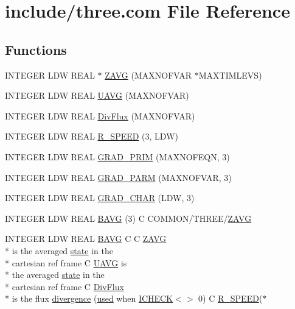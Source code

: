 \hypertarget{three_8com}{\section{include/three.com File Reference}
\label{three_8com}
}
\subsection*{Functions}
\begin{DoxyCompactItemize}
\item 
I\-N\-T\-E\-G\-E\-R L\-D\-W R\-E\-A\-L $\ast$ \hyperlink{three_8com_a63efc6c7080809fef3845bb143f55d41}{Z\-A\-V\-G} (M\-A\-X\-N\-O\-F\-V\-A\-R $\ast$M\-A\-X\-T\-I\-M\-L\-E\-V\-S)
\item 
I\-N\-T\-E\-G\-E\-R L\-D\-W R\-E\-A\-L \hyperlink{three_8com_ad59e2d047908ce4ed3fc820d45a326fb}{U\-A\-V\-G} (M\-A\-X\-N\-O\-F\-V\-A\-R)
\item 
I\-N\-T\-E\-G\-E\-R L\-D\-W R\-E\-A\-L \hyperlink{three_8com_a540efd196c8ba8ffacd2054d7cd37c3d}{Div\-Flux} (M\-A\-X\-N\-O\-F\-V\-A\-R)
\item 
I\-N\-T\-E\-G\-E\-R L\-D\-W R\-E\-A\-L \hyperlink{three_8com_ab9b65ce69bcdbe659e8abbf2992e665d}{R\-\_\-\-S\-P\-E\-E\-D} (3, L\-D\-W)
\item 
I\-N\-T\-E\-G\-E\-R L\-D\-W R\-E\-A\-L \hyperlink{three_8com_a92eab26680b58f9932bafdd58c32b8e2}{G\-R\-A\-D\-\_\-\-P\-R\-I\-M} (M\-A\-X\-N\-O\-F\-E\-Q\-N, 3)
\item 
I\-N\-T\-E\-G\-E\-R L\-D\-W R\-E\-A\-L \hyperlink{three_8com_a0716486ee6cba1f79eb140111cd27fbe}{G\-R\-A\-D\-\_\-\-P\-A\-R\-M} (M\-A\-X\-N\-O\-F\-V\-A\-R, 3)
\item 
I\-N\-T\-E\-G\-E\-R L\-D\-W R\-E\-A\-L \hyperlink{three_8com_a833c4eb4d311193f2327073489bfc52d}{G\-R\-A\-D\-\_\-\-C\-H\-A\-R} (L\-D\-W, 3)
\item 
I\-N\-T\-E\-G\-E\-R L\-D\-W R\-E\-A\-L \hyperlink{three_8com_a2408f8f2389b05690b544c00ce3e4f85}{B\-A\-V\-G} (3) C C\-O\-M\-M\-O\-N/T\-H\-R\-E\-E/\hyperlink{three_8com_a63efc6c7080809fef3845bb143f55d41}{Z\-A\-V\-G}
\item 
I\-N\-T\-E\-G\-E\-R L\-D\-W R\-E\-A\-L \hyperlink{three_8com_a2408f8f2389b05690b544c00ce3e4f85}{B\-A\-V\-G} C C \hyperlink{three_8com_a63efc6c7080809fef3845bb143f55d41}{Z\-A\-V\-G} \\*
is the averaged \hyperlink{merkle_8com_a0ca46ab387e5b2d25720de7e533a6180}{state} in the \\*
cartesian ref frame C \hyperlink{three_8com_ad59e2d047908ce4ed3fc820d45a326fb}{U\-A\-V\-G} is \\*
the averaged \hyperlink{merkle_8com_a0ca46ab387e5b2d25720de7e533a6180}{state} in the \\*
cartesian ref frame C \hyperlink{three_8com_a540efd196c8ba8ffacd2054d7cd37c3d}{Div\-Flux} \\*
is the flux \hyperlink{three_8com_ae0f9ebb6a15ea90a23eb0f18141f2974}{divergence} (\hyperlink{streamplasma_8com_ae33ecc71599b4338146f31d68e60c328}{used} when \hyperlink{flags_8com_a820fad8822140443f9e99a14c76dc711}{I\-C\-H\-E\-C\-K}$<$$>$ 0) C \hyperlink{three_8com_ab9b65ce69bcdbe659e8abbf2992e665d}{R\-\_\-\-S\-P\-E\-E\-D}($\ast$
\end{DoxyCompactItemize}
